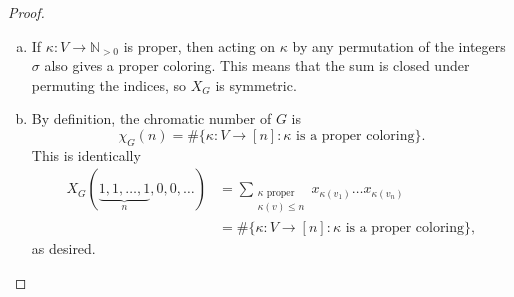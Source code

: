 \documentclass{article}
\newenvironment{problem}[2][Problem]{\begin{trivlist}
\item[\hskip \labelsep {\bfseries #1}\hskip \labelsep {\bfseries #2.}]}{\end{trivlist}}
\newcommand{\set}[1]{\{ #1 \}}
\newcommand{\fn}[3]{#1 \colon #2 \rightarrow #3}
\begin{document}
\pagebreak
\begin{problem}{4}
\end{problem}

\begin{proof} ~
  \begin{enumerate}[(a)]
    \item If $\kappa\colon V \rightarrow \mathbb N_{>0}$ is proper, then acting
      on $\kappa$ by any permutation of the integers $\sigma$ also gives a proper
      coloring. This means that the sum is closed under permuting the indices,
      so $X_G$ is symmetric.
    \item By definition, the chromatic number of $G$ is \[
      \chi_G(n) = \#\set{\fn \kappa V {[n]} : \kappa \text{ is a proper coloring}}.
    \] This is identically \begin{align*}
      X_G(\underbrace{1, 1, \hdots, 1}_n, 0, 0, \hdots)
      &= \sum_{\substack{
        \kappa \text{ proper} \\
        \kappa(v) \leq n
      }} x_{\kappa(v_1)} \hdots x_{\kappa(v_n)}  \\
      &= \#\set{\fn \kappa V {[n]} : \kappa \text{ is a proper coloring}},
    \end{align*} as desired.
  \end{enumerate}
\end{proof}
\end{document}
